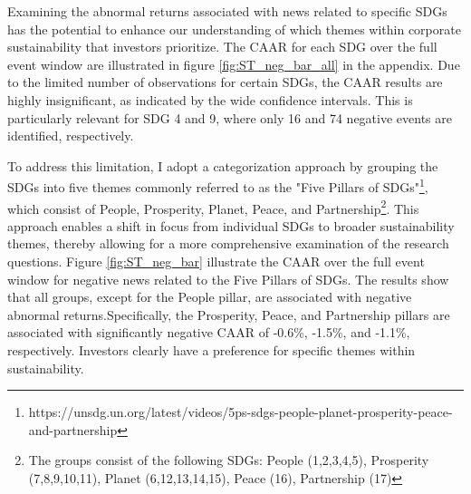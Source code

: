 Examining the abnormal returns associated with news related to specific SDGs has the potential to enhance our understanding of which themes within corporate sustainability that investors prioritize. The CAAR for each SDG over the full event window are illustrated in figure \ref{fig:ST_neg_bar_all} in the appendix. Due to the limited number of observations for certain SDGs, the CAAR results are highly insignificant, as indicated by the wide confidence intervals. This is particularly relevant for SDG 4 and 9, where only 16 and 74 negative events are identified, respectively. 

To address this limitation, I adopt a categorization approach by grouping the SDGs into five themes commonly referred to as the "Five Pillars of SDGs"\footnote{https://unsdg.un.org/latest/videos/5ps-sdgs-people-planet-prosperity-peace-and-partnership}, which consist of People, Prosperity, Planet, Peace, and Partnership\footnote{The groups consist of the following SDGs: People (1,2,3,4,5), Prosperity (7,8,9,10,11), Planet (6,12,13,14,15), Peace (16), Partnership (17)}.
This approach enables a shift in focus from individual SDGs to broader sustainability themes, thereby allowing for a more comprehensive examination of the research questions. Figure \ref{fig:ST_neg_bar} illustrate the CAAR over the full event window for negative news related to the Five Pillars of SDGs. The results show that all groups, except for the People pillar, are associated with negative abnormal returns.Specifically, the Prosperity, Peace, and Partnership pillars are associated with significantly negative CAAR of -0.6\%, -1.5\%, and -1.1\%, respectively. Investors clearly have a preference for specific themes within sustainability. 

